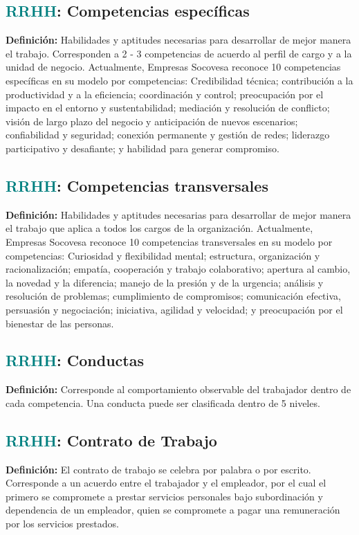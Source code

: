 \documentclass[12pt]{article}
\begin{document}
\subsection{\textcolor{teal}{RRHH}: Competencias específicas}
\textbf{Definición:} Habilidades y aptitudes necesarias para desarrollar de mejor manera el trabajo. Corresponden a 2 - 3 competencias de acuerdo al perfil de cargo y a la unidad de negocio. Actualmente, Empresas Socovesa reconoce 10 competencias específicas en su modelo por competencias: Credibilidad técnica; contribución a la productividad y a la eficiencia; coordinación y control; preocupación por el impacto en el entorno y sustentabilidad; mediación y resolución de conflicto; visión de largo plazo del negocio y anticipación de nuevos escenarios; confiabilidad y seguridad; conexión permanente y gestión de redes; liderazgo participativo y desafiante; y habilidad para generar compromiso.
\subsection{\textcolor{teal}{RRHH}: Competencias transversales}
\textbf{Definición:} Habilidades y aptitudes necesarias para desarrollar de mejor manera el trabajo que aplica a todos los cargos de la organización. Actualmente, Empresas Socovesa reconoce 10 competencias transversales en su modelo por competencias: Curiosidad y flexibilidad mental; estructura, organización y racionalización; empatía, cooperación y trabajo colaborativo; apertura al cambio, la novedad y la diferencia; manejo de la presión y de la urgencia; análisis y resolución de problemas; cumplimiento de compromisos; comunicación efectiva, persuasión y negociación; iniciativa, agilidad y velocidad; y preocupación por el bienestar de las personas.
\subsection{\textcolor{teal}{RRHH}: Conductas}
\textbf{Definición:} Corresponde al comportamiento observable del trabajador dentro de cada competencia. Una conducta puede ser clasificada dentro de 5 niveles.
\subsection{\textcolor{teal}{RRHH}: Contrato de Trabajo}
\textbf{Definición:} El contrato de trabajo se celebra por palabra o por escrito. Corresponde a un acuerdo entre el trabajador y el empleador, por el cual el primero se compromete a prestar servicios personales bajo subordinación y dependencia de un empleador, quien se compromete a pagar una remuneración por los servicios prestados.
\end{document}
